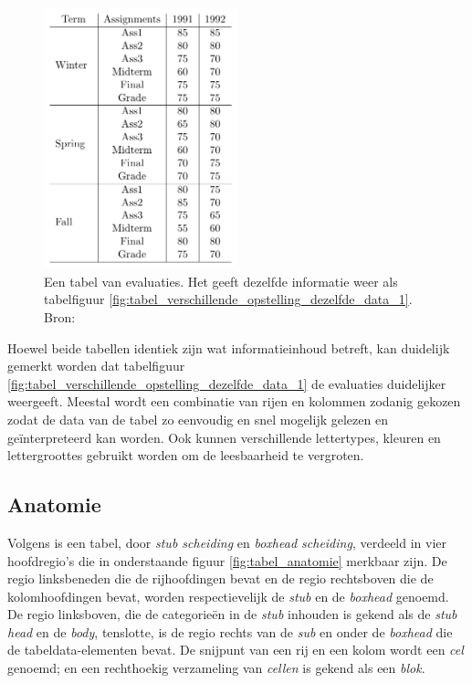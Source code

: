\begin{figure}[H]
    \centering
    \includegraphics[width=0.5\textwidth]{img/tabel_verschillende_opstelling_dezelfde_data_2.png}
    \caption{Een tabel van evaluaties. Het geeft dezelfde informatie weer als tabelfiguur \ref{fig:tabel_verschillende_opstelling_dezelfde_data_1}. Bron: \cite{Long2010}}
    \label{fig:tabel_verschillende_opstelling_dezelfde_data_2}
\end{figure}

Hoewel beide tabellen identiek zijn wat informatieinhoud betreft, kan duidelijk gemerkt worden dat tabelfiguur \ref{fig:tabel_verschillende_opstelling_dezelfde_data_1} de evaluaties duidelijker weergeeft. Meestal wordt een combinatie van rijen en kolommen zodanig gekozen zodat de data van de tabel zo eenvoudig en snel mogelijk gelezen en geïnterpreteerd kan worden. Ook kunnen verschillende lettertypes, kleuren en lettergroottes gebruikt worden om de leesbaarheid te vergroten.

\subsection{Anatomie}
\label{subsec:anatomie}

\raggedbottom

Volgens \textcite{Wang1996} is een tabel, door \textit{stub scheiding} en \textit{boxhead scheiding}, verdeeld in vier hoofdregio's die in onderstaande figuur \ref{fig:tabel_anatomie} merkbaar zijn. De regio linksbeneden die de rijhoofdingen bevat en de regio rechtsboven die de kolomhoofdingen bevat, worden respectievelijk de \textit{stub} en de \textit{boxhead} genoemd. De regio linksboven, die de categorieën in de \textit{stub} inhouden is gekend als de \textit{stub head} en de \textit{body}, tenslotte, is de regio rechts van de \textit{sub} en onder de \textit{boxhead} die de tabeldata-elementen bevat. De snijpunt van een rij en een kolom wordt een \textit{cel} genoemd; en een rechthoekig verzameling van \textit{cellen} is gekend als een \textit{blok}.

